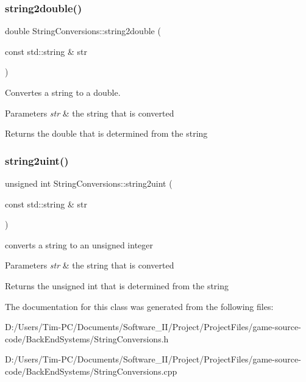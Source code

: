 \subsubsection{\texorpdfstring{string2double()}{string2double()}}
{\footnotesize\ttfamily double String\+Conversions\+::string2double (\begin{DoxyParamCaption}\item[{const std\+::string \&}]{str }\end{DoxyParamCaption})\hspace{0.3cm}{\ttfamily [static]}}



Convertes a string to a double. 


\begin{DoxyParams}{Parameters}
{\em str} & the string that is converted \\
\hline
\end{DoxyParams}
\begin{DoxyReturn}{Returns}
the double that is determined from the string 
\end{DoxyReturn}
\mbox{\label{class_string_conversions_a74a58903eb2c9971a0fe3ededbde9504}} 
\subsubsection{\texorpdfstring{string2uint()}{string2uint()}}
{\footnotesize\ttfamily unsigned int String\+Conversions\+::string2uint (\begin{DoxyParamCaption}\item[{const std\+::string \&}]{str }\end{DoxyParamCaption})\hspace{0.3cm}{\ttfamily [static]}}



converts a string to an unsigned integer 


\begin{DoxyParams}{Parameters}
{\em str} & the string that is converted \\
\hline
\end{DoxyParams}
\begin{DoxyReturn}{Returns}
the unsigned int that is determined from the string 
\end{DoxyReturn}


The documentation for this class was generated from the following files\+:\begin{DoxyCompactItemize}
\item 
D\+:/\+Users/\+Tim-\/\+P\+C/\+Documents/\+Software\+\_\+\+I\+I/\+Project/\+Project\+Files/game-\/source-\/code/\+Back\+End\+Systems/String\+Conversions.\+h\item 
D\+:/\+Users/\+Tim-\/\+P\+C/\+Documents/\+Software\+\_\+\+I\+I/\+Project/\+Project\+Files/game-\/source-\/code/\+Back\+End\+Systems/String\+Conversions.\+cpp\end{DoxyCompactItemize}
